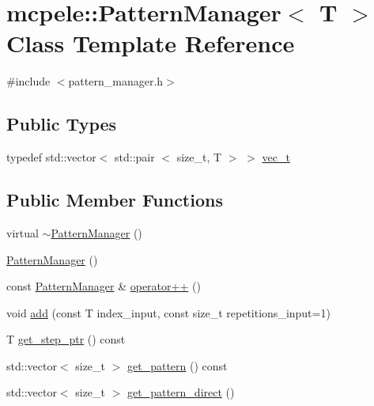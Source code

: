 \hypertarget{classmcpele_1_1PatternManager}{\section{mcpele\-:\-:\-Pattern\-Manager$<$ \-T $>$ \-Class \-Template \-Reference}
\label{classmcpele_1_1PatternManager}
}


{\ttfamily \#include $<$pattern\-\_\-manager.\-h$>$}

\subsection*{\-Public \-Types}
\begin{DoxyCompactItemize}
\item 
typedef std\-::vector$<$ std\-::pair\*
$<$ size\-\_\-t, \-T $>$ $>$ \hyperlink{classmcpele_1_1PatternManager_a36be567f23cf68de43413b14faf94106}{vec\-\_\-t}
\end{DoxyCompactItemize}
\subsection*{\-Public \-Member \-Functions}
\begin{DoxyCompactItemize}
\item 
virtual \hyperlink{classmcpele_1_1PatternManager_a6c7269b5132d71220d9a6d9776a3465e}{$\sim$\-Pattern\-Manager} ()
\item 
\hyperlink{classmcpele_1_1PatternManager_a90c6acd70f630bc769a3fc0a11dd5bf3}{\-Pattern\-Manager} ()
\item 
const \hyperlink{classmcpele_1_1PatternManager}{\-Pattern\-Manager} \& \hyperlink{classmcpele_1_1PatternManager_a1463b8b07b29148b4e56319719bd28d0}{operator++} ()
\item 
void \hyperlink{classmcpele_1_1PatternManager_a5ac6dc58164f62b123dda3cd7258022c}{add} (const \-T index\-\_\-input, const size\-\_\-t repetitions\-\_\-input=1)
\item 
\-T \hyperlink{classmcpele_1_1PatternManager_ad89c8cda16638f8a01cacb98122be970}{get\-\_\-step\-\_\-ptr} () const 
\item 
std\-::vector$<$ size\-\_\-t $>$ \hyperlink{classmcpele_1_1PatternManager_a4d3c6d5b2d94c5403f853d5947801f86}{get\-\_\-pattern} () const 
\item 
std\-::vector$<$ size\-\_\-t $>$ \hyperlink{classmcpele_1_1PatternManager_a5aa0545123e683f50e696265414fe378}{get\-\_\-pattern\-\_\-direct} ()
\end{DoxyCompactItemize}


